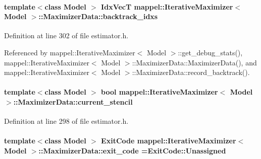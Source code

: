 \paragraph[{\texorpdfstring{backtrack\+\_\+idxs}{backtrack_idxs}}]{\setlength{\rightskip}{0pt plus 5cm}template$<$class Model $>$ {\bf Idx\+VecT} {\bf mappel\+::\+Iterative\+Maximizer}$<$ Model $>$\+::Maximizer\+Data\+::backtrack\+\_\+idxs\hspace{0.3cm}{\ttfamily [protected]}}\hypertarget{classmappel_1_1IterativeMaximizer_1_1MaximizerData_a088734ca36fdf979d8e57779352b2f79}{}\label{classmappel_1_1IterativeMaximizer_1_1MaximizerData_a088734ca36fdf979d8e57779352b2f79}


Definition at line 302 of file estimator.\+h.



Referenced by mappel\+::\+Iterative\+Maximizer$<$ Model $>$\+::get\+\_\+debug\+\_\+stats(), mappel\+::\+Iterative\+Maximizer$<$ Model $>$\+::\+Maximizer\+Data\+::\+Maximizer\+Data(), and mappel\+::\+Iterative\+Maximizer$<$ Model $>$\+::\+Maximizer\+Data\+::record\+\_\+backtrack().

\paragraph[{\texorpdfstring{current\+\_\+stencil}{current_stencil}}]{\setlength{\rightskip}{0pt plus 5cm}template$<$class Model $>$ bool {\bf mappel\+::\+Iterative\+Maximizer}$<$ Model $>$\+::Maximizer\+Data\+::current\+\_\+stencil\hspace{0.3cm}{\ttfamily [protected]}}\hypertarget{classmappel_1_1IterativeMaximizer_1_1MaximizerData_a321e112eacabe76c882ea8976efb0e9b}{}\label{classmappel_1_1IterativeMaximizer_1_1MaximizerData_a321e112eacabe76c882ea8976efb0e9b}


Definition at line 298 of file estimator.\+h.

\paragraph[{\texorpdfstring{exit\+\_\+code}{exit_code}}]{\setlength{\rightskip}{0pt plus 5cm}template$<$class Model $>$ {\bf Exit\+Code} {\bf mappel\+::\+Iterative\+Maximizer}$<$ Model $>$\+::Maximizer\+Data\+::exit\+\_\+code ={\bf Exit\+Code\+::\+Unassigned}}\hypertarget{classmappel_1_1IterativeMaximizer_1_1MaximizerData_abf4f25be02f47143a077c7ac6419aed6}{}\label{classmappel_1_1IterativeMaximizer_1_1MaximizerData_abf4f25be02f47143a077c7ac6419aed6}


